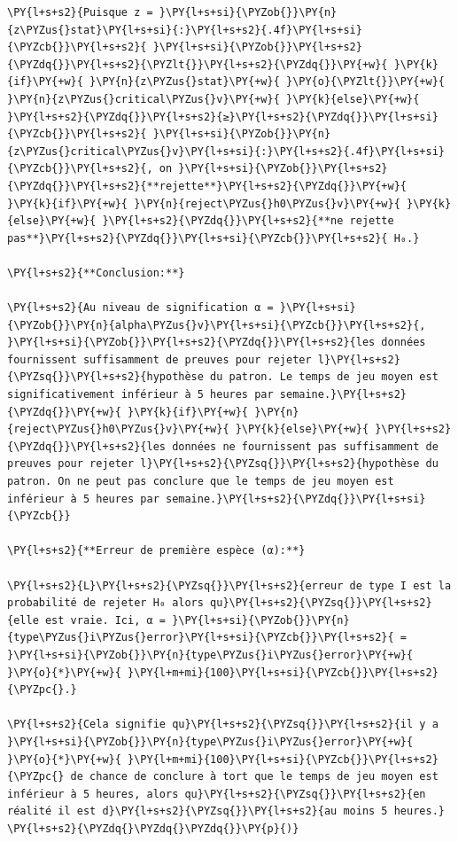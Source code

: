 \begin{tcolorbox}[breakable, size=fbox, boxrule=1pt, pad at break*=1mm,colback=cellbackground, colframe=cellborder]
\begin{Verbatim}[commandchars=\\\{\}]
\PY{l+s+s2}{Puisque z = }\PY{l+s+si}{\PYZob{}}\PY{n}{z\PYZus{}stat}\PY{l+s+si}{:}\PY{l+s+s2}{.4f}\PY{l+s+si}{\PYZcb{}}\PY{l+s+s2}{ }\PY{l+s+si}{\PYZob{}}\PY{l+s+s2}{\PYZdq{}}\PY{l+s+s2}{\PYZlt{}}\PY{l+s+s2}{\PYZdq{}}\PY{+w}{ }\PY{k}{if}\PY{+w}{ }\PY{n}{z\PYZus{}stat}\PY{+w}{ }\PY{o}{\PYZlt{}}\PY{+w}{ }\PY{n}{z\PYZus{}critical\PYZus{}v}\PY{+w}{ }\PY{k}{else}\PY{+w}{ }\PY{l+s+s2}{\PYZdq{}}\PY{l+s+s2}{≥}\PY{l+s+s2}{\PYZdq{}}\PY{l+s+si}{\PYZcb{}}\PY{l+s+s2}{ }\PY{l+s+si}{\PYZob{}}\PY{n}{z\PYZus{}critical\PYZus{}v}\PY{l+s+si}{:}\PY{l+s+s2}{.4f}\PY{l+s+si}{\PYZcb{}}\PY{l+s+s2}{, on }\PY{l+s+si}{\PYZob{}}\PY{l+s+s2}{\PYZdq{}}\PY{l+s+s2}{**rejette**}\PY{l+s+s2}{\PYZdq{}}\PY{+w}{ }\PY{k}{if}\PY{+w}{ }\PY{n}{reject\PYZus{}h0\PYZus{}v}\PY{+w}{ }\PY{k}{else}\PY{+w}{ }\PY{l+s+s2}{\PYZdq{}}\PY{l+s+s2}{**ne rejette pas**}\PY{l+s+s2}{\PYZdq{}}\PY{l+s+si}{\PYZcb{}}\PY{l+s+s2}{ H₀.}

\PY{l+s+s2}{**Conclusion:**}

\PY{l+s+s2}{Au niveau de signification α = }\PY{l+s+si}{\PYZob{}}\PY{n}{alpha\PYZus{}v}\PY{l+s+si}{\PYZcb{}}\PY{l+s+s2}{, }\PY{l+s+si}{\PYZob{}}\PY{l+s+s2}{\PYZdq{}}\PY{l+s+s2}{les données fournissent suffisamment de preuves pour rejeter l}\PY{l+s+s2}{\PYZsq{}}\PY{l+s+s2}{hypothèse du patron. Le temps de jeu moyen est significativement inférieur à 5 heures par semaine.}\PY{l+s+s2}{\PYZdq{}}\PY{+w}{ }\PY{k}{if}\PY{+w}{ }\PY{n}{reject\PYZus{}h0\PYZus{}v}\PY{+w}{ }\PY{k}{else}\PY{+w}{ }\PY{l+s+s2}{\PYZdq{}}\PY{l+s+s2}{les données ne fournissent pas suffisamment de preuves pour rejeter l}\PY{l+s+s2}{\PYZsq{}}\PY{l+s+s2}{hypothèse du patron. On ne peut pas conclure que le temps de jeu moyen est inférieur à 5 heures par semaine.}\PY{l+s+s2}{\PYZdq{}}\PY{l+s+si}{\PYZcb{}}

\PY{l+s+s2}{**Erreur de première espèce (α):**}

\PY{l+s+s2}{L}\PY{l+s+s2}{\PYZsq{}}\PY{l+s+s2}{erreur de type I est la probabilité de rejeter H₀ alors qu}\PY{l+s+s2}{\PYZsq{}}\PY{l+s+s2}{elle est vraie. Ici, α = }\PY{l+s+si}{\PYZob{}}\PY{n}{type\PYZus{}i\PYZus{}error}\PY{l+s+si}{\PYZcb{}}\PY{l+s+s2}{ = }\PY{l+s+si}{\PYZob{}}\PY{n}{type\PYZus{}i\PYZus{}error}\PY{+w}{ }\PY{o}{*}\PY{+w}{ }\PY{l+m+mi}{100}\PY{l+s+si}{\PYZcb{}}\PY{l+s+s2}{\PYZpc{}.}

\PY{l+s+s2}{Cela signifie qu}\PY{l+s+s2}{\PYZsq{}}\PY{l+s+s2}{il y a }\PY{l+s+si}{\PYZob{}}\PY{n}{type\PYZus{}i\PYZus{}error}\PY{+w}{ }\PY{o}{*}\PY{+w}{ }\PY{l+m+mi}{100}\PY{l+s+si}{\PYZcb{}}\PY{l+s+s2}{\PYZpc{} de chance de conclure à tort que le temps de jeu moyen est inférieur à 5 heures, alors qu}\PY{l+s+s2}{\PYZsq{}}\PY{l+s+s2}{en réalité il est d}\PY{l+s+s2}{\PYZsq{}}\PY{l+s+s2}{au moins 5 heures.}
\PY{l+s+s2}{\PYZdq{}\PYZdq{}\PYZdq{}}\PY{p}{)}
\end{Verbatim}
\end{tcolorbox}



